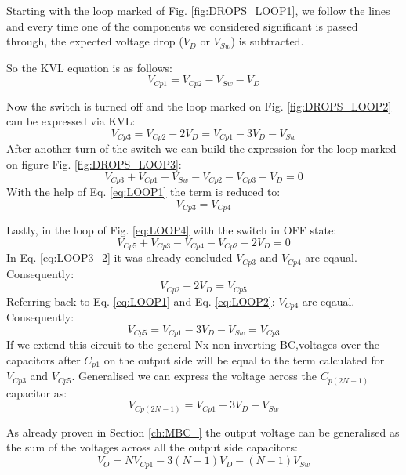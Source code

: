 Starting with the loop marked of Fig. \ref{fig:DROPS_LOOP1}, we follow the lines and every time one of the components we considered significant is passed through, the expected voltage drop ($V_D$ or $V_{Sw}$) is subtracted.

So the KVL equation is as follows: 
\begin{equation}
	V_{Cp1} = V_{Cp2}-V_{Sw}-V_D
	\label{eq:LOOP1}
\end{equation}

Now the switch is turned off and the loop marked on Fig. \ref{fig:DROPS_LOOP2} can be expressed via KVL: 
\begin{equation}
	V_{Cp3} = V_{Cp2}-2V_D=V_{Cp1}-3V_D-V_{Sw}
	\label{eq:LOOP2}
\end{equation}
After another turn of the switch we can build the expression for the loop marked on figure Fig. \ref{fig:DROPS_LOOP3}:
\begin{equation}
	V_{Cp3}+V_{Cp1}-V_{Sw}-V_{Cp2}-V_{Cp3}-V_D=0
	\label{eq:LOOP3_1}
\end{equation}
With the help of Eq. \ref{eq:LOOP1} the term is reduced to:
\begin{equation}
	V_{Cp3} = V_{Cp4}
	\label{eq:LOOP3_2}
\end{equation}

Lastly, in the loop of Fig. \ref{eq:LOOP4} with the switch in OFF state:
\begin{equation}
	V_{Cp5}+V_{Cp3}-V_{Cp4}-V_{Cp2}-2V_D = 0
	\label{eq:LOOP4_1}
\end{equation}
In Eq. \ref{eq:LOOP3_2} it was already concluded $V_{Cp3}$ and $V_{Cp4}$ are eqaual. Consequently: 
\begin{equation}
	V_{Cp2}-2V_D = V_{Cp5}
	\label{eq:LOOP4_2}
\end{equation}
Referring back to Eq. \ref{eq:LOOP1} and Eq. \ref{eq:LOOP2}: 
$V_{Cp4}$ are eqaual. Consequently: 
\begin{equation}
	V_{Cp5}=V_{Cp1}-3V_D-V_{Sw} =V_{Cp3} 
	\label{eq:LOOP4_3}
\end{equation}
If we extend this circuit to the general Nx non-inverting BC,voltages over the capacitors after $C_{p1}$ on the output side will be equal to the term calculated for $V_{Cp3}$ and  $V_{Cp5}$. Generalised we can express the voltage across the $C_{p(2N-1)}$ capacitor as: 
\begin{equation}
	V_{Cp(2N-1)}= V_{Cp1}-3V_D-V_{Sw} 
	\label{eq:C_2N-1}
\end{equation}

As already proven in Section \ref{ch:MBC_} the output voltage can be generalised as the sum of the voltages across all the output side capacitors: 
\begin{equation}
	V_{O}= NV_{Cp1}-3(N-1)V_D-(N-1)V_{Sw} 
	\label{eq:DROPS_V_O}
\end{equation}


